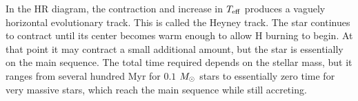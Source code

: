 In the HR diagram, the contraction and increase in $T_{\rm eff}$ produces a vaguely horizontal evolutionary track. This is called the Heyney track. The star continues to contract until its center becomes warm enough to allow H burning to begin.
At that point it may contract a small additional amount, but the star is essentially on the main sequence. The total time required depends on the stellar mass, but it ranges from several hundred Myr for $0.1$ $M_{\odot}$ stars to essentially zero time for very massive stars, which reach the main sequence while still accreting.


